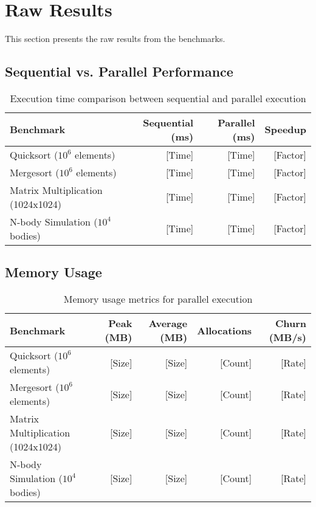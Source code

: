 \documentclass[12pt,a4paper]{report}
\begin{document}
\section{Raw Results}
This section presents the raw results from the benchmarks.

\subsection{Sequential vs. Parallel Performance}
\begin{table}[h]
    \centering
    \begin{tabular}{lrrr}
        \toprule
        \textbf{Benchmark} & \textbf{Sequential (ms)} & \textbf{Parallel (ms)} & \textbf{Speedup} \\
        \midrule
        Quicksort ($10^6$ elements) & [Time] & [Time] & [Factor] \\
        Mergesort ($10^6$ elements) & [Time] & [Time] & [Factor] \\
        Matrix Multiplication (1024x1024) & [Time] & [Time] & [Factor] \\
        N-body Simulation ($10^4$ bodies) & [Time] & [Time] & [Factor] \\
        \bottomrule
    \end{tabular}
    \caption{Execution time comparison between sequential and parallel execution}
    \label{tab:perf_comparison}
\end{table}

\subsection{Memory Usage}
\begin{table}[h]
    \centering
    \begin{tabular}{lrrrr}
        \toprule
        \textbf{Benchmark} & \textbf{Peak (MB)} & \textbf{Average (MB)} & \textbf{Allocations} & \textbf{Churn (MB/s)} \\
        \midrule
        Quicksort ($10^6$ elements) & [Size] & [Size] & [Count] & [Rate] \\
        Mergesort ($10^6$ elements) & [Size] & [Size] & [Count] & [Rate] \\
        Matrix Multiplication (1024x1024) & [Size] & [Size] & [Count] & [Rate] \\
        N-body Simulation ($10^4$ bodies) & [Size] & [Size] & [Count] & [Rate] \\
        \bottomrule
    \end{tabular}
    \caption{Memory usage metrics for parallel execution}
    \label{tab:memory_usage}
\end{table}
\end{document}
